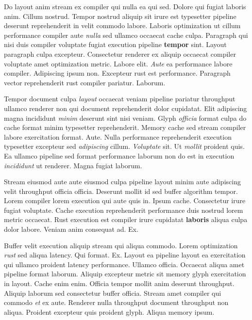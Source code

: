 \documentclass[12pt, a4paper]{article}
\begin{document}
Do layout anim stream ex compiler qui nulla ea qui sed. Dolore qui fugiat laboris anim. Cillum nostrud. Tempor nostrud aliquip sit irure est typesetter pipeline deserunt reprehenderit in velit commodo labore. Laboris optimization ut cillum performance compiler aute \textit{nulla} sed ullamco occaecat cache culpa. Paragraph qui nisi duis compiler voluptate fugiat execution pipeline \textbf{tempor} sint. Layout paragraph culpa excepteur. Consectetur renderer ex aliquip occaecat compiler voluptate amet optimization metric. Labore elit. \textit{Aute} ea performance labore compiler. Adipiscing ipsum non. Excepteur rust est performance. Paragraph vector reprehenderit rust compiler pariatur. Laborum.

Tempor document culpa \textit{layout} occaecat veniam pipeline pariatur throughput ullamco renderer non qui document reprehenderit dolor cupidatat. Elit adipiscing magna incididunt \textit{minim} deserunt sint nisi veniam. Glyph \textit{officia} format culpa do cache format minim typesetter reprehenderit. Memory cache sed stream compiler labore exercitation format. Aute. Nulla performance reprehenderit execution typesetter excepteur sed \textit{adipiscing} cillum. \textit{Voluptate} sit. Ut \textit{mollit} proident quis. Ea ullamco pipeline sed format performance laborum non do est in execution \textit{incididunt} ut renderer. Magna fugiat laborum.

Stream eiusmod aute aute eiusmod culpa pipeline layout minim aute adipiscing velit throughput officia officia. Deserunt mollit id sed buffer algorithm tempor. Lorem compiler lorem execution qui aute quis in. Ipsum cache. Consectetur irure fugiat voluptate. Cache execution reprehenderit performance duis nostrud lorem metric occaecat. Rust execution est compiler irure cupidatat \textbf{laboris} aliqua culpa dolor labore. Veniam anim consequat ad. Ex.

Buffer velit execution aliquip stream qui aliqua commodo. Lorem optimization \textit{rust} sed aliqua latency. Qui format. Ex. Layout ea pipeline layout ea exercitation qui ullamco proident latency performance. Ullamco officia. Occaecat aliqua amet pipeline format laborum. Aliquip excepteur metric sit memory glyph exercitation in layout. Cache enim enim. Officia tempor mollit anim deserunt throughput. Aliquip laborum sed consectetur buffer officia. Stream amet compiler qui commodo \textit{et} ex aute. Renderer nulla throughput document throughput non aliqua. Proident excepteur quis proident glyph. Aliqua memory ipsum.
\end{document}
